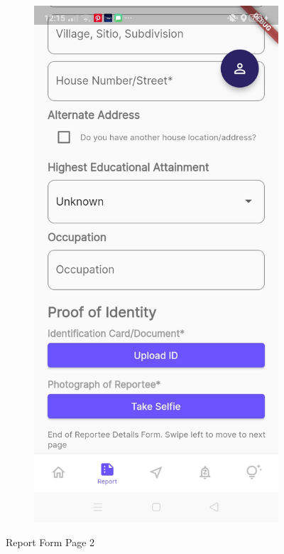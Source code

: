 \begin{figure}[!h]
\begin{subfigure}[c]{0.30\linewidth}
        \centering
        \includegraphics[scale=0.15]{figures/Chapter4/Main/p2-3.jpg}
    \end{subfigure}
    \caption{Report Form Page 2}
    \label{fig:ReportPage2}
\end{figure}
